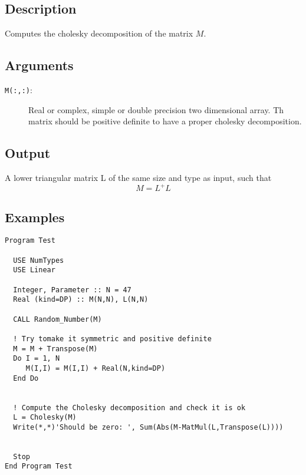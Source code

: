 \subsection{Description}

Computes the cholesky decomposition of the matrix $M$.

\subsection{Arguments}

\begin{description}
\item[\texttt{M(:,:)}: ] Real or complex, simple or double precision
  two dimensional array. Th matrix should be positive definite to have
  a proper cholesky decomposition. 
\end{description}

\subsection{Output}

A lower triangular matrix L of the same size and type as input, such
that
\begin{displaymath}
M = L^+ L  
\end{displaymath}

\subsection{Examples}

\begin{lstlisting}[emph=Cholesky,
                   emphstyle=\color{blue},
                   frame=trBL,
                   caption=Computing the cholesky decomposition of a matrix.,
                   label=cholesky]
Program Test

  USE NumTypes
  USE Linear

  Integer, Parameter :: N = 47
  Real (kind=DP) :: M(N,N), L(N,N)

  CALL Random_Number(M)
  
  ! Try tomake it symmetric and positive definite
  M = M + Transpose(M)
  Do I = 1, N
     M(I,I) = M(I,I) + Real(N,kind=DP)
  End Do


  ! Compute the Cholesky decomposition and check it is ok
  L = Cholesky(M)
  Write(*,*)'Should be zero: ', Sum(Abs(M-MatMul(L,Transpose(L))))


  Stop
End Program Test
\end{lstlisting}


